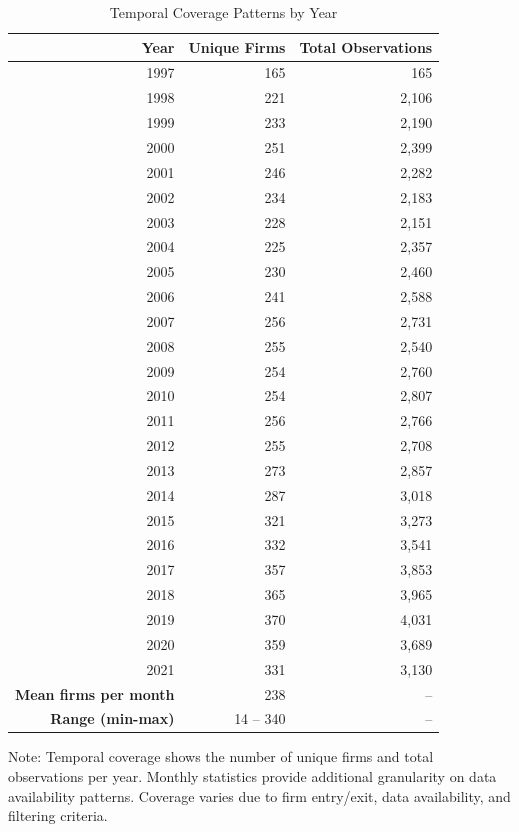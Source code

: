 
\begin{table}[htbp]
\centering
\caption{Temporal Coverage Patterns by Year}
\label{tab:temporal_coverage}
\begin{tabular}{rrr}
\toprule
\textbf{Year} & \textbf{Unique Firms} & \textbf{Total Observations} \\
\midrule
1997 & 165 & 165 \\
1998 & 221 & 2,106 \\
1999 & 233 & 2,190 \\
2000 & 251 & 2,399 \\
2001 & 246 & 2,282 \\
2002 & 234 & 2,183 \\
2003 & 228 & 2,151 \\
2004 & 225 & 2,357 \\
2005 & 230 & 2,460 \\
2006 & 241 & 2,588 \\
2007 & 256 & 2,731 \\
2008 & 255 & 2,540 \\
2009 & 254 & 2,760 \\
2010 & 254 & 2,807 \\
2011 & 256 & 2,766 \\
2012 & 255 & 2,708 \\
2013 & 273 & 2,857 \\
2014 & 287 & 3,018 \\
2015 & 321 & 3,273 \\
2016 & 332 & 3,541 \\
2017 & 357 & 3,853 \\
2018 & 365 & 3,965 \\
2019 & 370 & 4,031 \\
2020 & 359 & 3,689 \\
2021 & 331 & 3,130 \\
\midrule
\textbf{Mean firms per month} & 238 & -- \\
\textbf{Range (min-max)} & 14 -- 340 & -- \\
\bottomrule
\end{tabular}
\begin{tablenotes}
\small
\item Note: Temporal coverage shows the number of unique firms and total observations per year.
Monthly statistics provide additional granularity on data availability patterns.
Coverage varies due to firm entry/exit, data availability, and filtering criteria.
\end{tablenotes}
\end{table}
